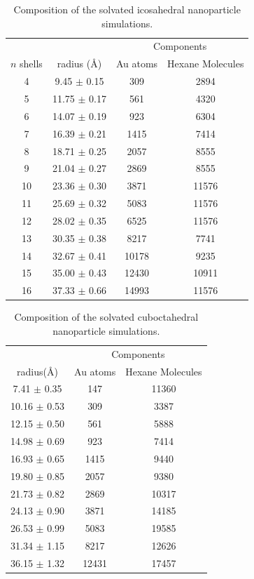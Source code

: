 \documentclass[journal = jpccck, manuscript = suppinfo]{achemso}
\begin{document}
\begin{table}
\centering
\caption{Composition of the solvated icosahedral nanoparticle simulations.  
  \label{tab:icosahedra}}
\begin{tabular}{ cc|cc }
\toprule
       &            & \multicolumn{2}{c}{Components}\\
$n$ shells & radius (\AA) & Au atoms & Hexane Molecules \\
\midrule
4  &  9.45 $\pm$ 0.15  &   309 &  2894      \\
5  & 11.75 $\pm$ 0.17  &   561 &  4320      \\
6  & 14.07 $\pm$ 0.19  &   923 &  6304      \\
7  & 16.39 $\pm$ 0.21  &  1415 &  7414      \\
8  & 18.71 $\pm$ 0.25  &  2057 &  8555      \\
9  & 21.04 $\pm$ 0.27  &  2869 &  8555      \\
10 & 23.36 $\pm$ 0.30  &  3871 & 11576      \\
11 & 25.69 $\pm$ 0.32  &  5083 & 11576      \\
12 & 28.02 $\pm$ 0.35  &  6525 & 11576      \\
13 & 30.35 $\pm$ 0.38  &  8217 &  7741      \\
14 & 32.67 $\pm$ 0.41  & 10178 &  9235      \\
15 & 35.00 $\pm$ 0.43  & 12430 & 10911      \\
16 & 37.33 $\pm$ 0.66  & 14993 & 11576      \\
\bottomrule
\end{tabular}
\end{table}

\begin{table}
\centering
\caption{Composition of the solvated cuboctahedral nanoparticle simulations.
  \label{tab:cubos}}
\begin{tabular}{ c|cc }
\toprule
        & \multicolumn{2}{c}{Components}\\
 radius(\AA)      & Au atoms & Hexane Molecules \\
\midrule
 7.41 $\pm$ 0.35  &   147 & 11360      \\
10.16 $\pm$ 0.53  &   309 &  3387      \\
12.15 $\pm$ 0.50  &   561 &  5888      \\
14.98 $\pm$ 0.69  &   923 &  7414      \\
16.93 $\pm$ 0.65  &  1415 &  9440      \\
19.80 $\pm$ 0.85  &  2057 &  9380      \\
21.73 $\pm$ 0.82  &  2869 & 10317      \\
24.13 $\pm$ 0.90  &  3871 & 14185      \\
26.53 $\pm$ 0.99  &  5083 & 19585      \\
31.34 $\pm$ 1.15  &  8217 & 12626      \\
36.15 $\pm$ 1.32  & 12431 & 17457     \\
\bottomrule
\end{tabular}
\end{table}
\end{document}

